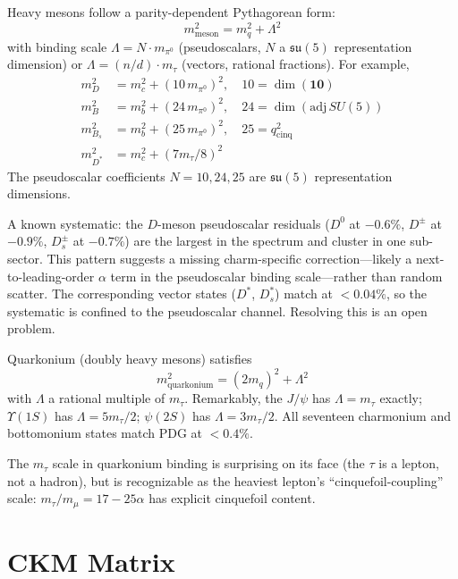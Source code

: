 \documentclass[11pt]{article}
\newcommand{\su}{\mathfrak{su}}
\begin{document}
Heavy mesons follow a parity-dependent Pythagorean form:
\begin{equation}
  m^2_\text{meson} = m_q^2 + \Lambda^2
\end{equation}
with binding scale $\Lambda = N\cdot m_{\pi^0}$ (pseudoscalars,
$N$ a $\su(5)$ representation dimension) or
$\Lambda = (n/d)\cdot m_\tau$ (vectors, rational fractions).  For
example,
\begin{align}
  m_D^2     &= m_c^2 + (10\,m_{\pi^0})^2,\quad 10 = \dim(\mathbf{10})\\
  m_B^2     &= m_b^2 + (24\,m_{\pi^0})^2,\quad 24 = \dim(\mathrm{adj}\,SU(5))\\
  m_{B_s}^2 &= m_b^2 + (25\,m_{\pi^0})^2,\quad 25 = q^2_\text{cinq}\\
  m_{D^*}^2 &= m_c^2 + (7 m_\tau/8)^2
\end{align}
The pseudoscalar coefficients $N = 10, 24, 25$ are
$\su(5)$ representation dimensions.

A known systematic: the $D$-meson pseudoscalar residuals ($D^0$ at
$-0.6\%$, $D^\pm$ at $-0.9\%$, $D_s^\pm$ at $-0.7\%$) are the
largest in the spectrum and cluster in one sub-sector.  This pattern
suggests a missing charm-specific correction---likely a
next-to-leading-order $\alpha$ term in the pseudoscalar binding
scale---rather than random scatter.  The corresponding vector states
($D^*$, $D^*_s$) match at $<0.04\%$, so the systematic is confined
to the pseudoscalar channel.  Resolving this is an open problem.

Quarkonium (doubly heavy mesons) satisfies
\begin{equation}
  m^2_\text{quarkonium} = (2 m_q)^2 + \Lambda^2
\end{equation}
with $\Lambda$ a rational multiple of $m_\tau$.  Remarkably, the
$J/\psi$ has $\Lambda = m_\tau$ exactly; $\Upsilon(1S)$ has
$\Lambda = 5 m_\tau/2$; $\psi(2S)$ has $\Lambda = 3 m_\tau/2$.
All seventeen charmonium and bottomonium states match PDG at
$<0.4\%$.

The $m_\tau$ scale in quarkonium binding is surprising on its face
(the $\tau$ is a lepton, not a hadron), but is recognizable as the
heaviest lepton's ``cinquefoil-coupling'' scale: $m_\tau/m_\mu =
17 - 25\alpha$ has explicit cinquefoil content.

\section{CKM Matrix}
\label{sec:ckm}
\end{document}
